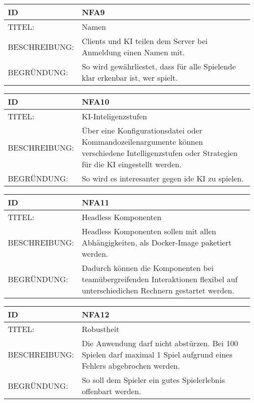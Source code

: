 \documentclass{uulm-assignment}
\begin{document}
    \begin{tabularx}{\textwidth}{|l|X |} \hline
        \textbf{ID} & \textbf{NFA9} \\
        \hline
        TITEL: &  Namen\\
        \hline
        BESCHREIBUNG: &  Clients und KI teilen dem Server bei Anmeldung einen Namen mit.\\
        \hline
        BEGRÜNDUNG: &  So wird gewährliestet, dass für alle Spielende klar erkenbar ist, wer spielt.\\
        \hline
    \end{tabularx}

    
    \begin{tabularx}{\textwidth}{|l|X |} \hline
        \textbf{ID} & \textbf{NFA10} \\
        \hline
        TITEL: &  KI-Inteligenzstufen\\
        \hline
        BESCHREIBUNG: &  Über eine Konfigurationsdatei oder Kommandozeilenargumente können verschiedene
Intelligenzstufen oder Strategien für die KI eingestellt werden.\\
        \hline
        BEGRÜNDUNG: &  So wird es interesanter gegen ide KI zu spielen.\\
        \hline
    \end{tabularx}

    \begin{tabularx}{\textwidth}{|l|X |} \hline
        \textbf{ID} & \textbf{NFA11} \\
        \hline
        TITEL: & Headless Komponenten\\
        \hline
        BESCHREIBUNG: & Headless Komponenten sollen mit allen Abhängigkeiten, als Docker-Image paketiert werden.\\
        \hline
        BEGRÜNDUNG: & Dadurch können die Komponenten bei teamübergreifenden Interaktionen flexibel auf unterschiedichen Rechnern gestartet werden.\\
        \hline
    \end{tabularx}

    \begin{tabularx}{\textwidth}{|l|X |} \hline
        \textbf{ID} & \textbf{NFA12} \\
        \hline
        TITEL: & Robustheit \\
        \hline
        BESCHREIBUNG: & Die Anwendung darf nicht abstürzen. Bei 100 Spielen darf maximal 1 Spiel
        aufgrund eines Fehlers abgebrochen werden. \\
        \hline
        BEGRÜNDUNG: & So soll dem Spieler ein gutes Spielerlebnis offenbart werden. \\
        \hline
    \end{tabularx}
    
\end{document}

